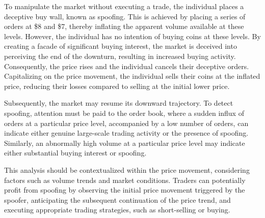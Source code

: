 To manipulate the market without executing a trade, the individual places a deceptive buy wall, known as spoofing. This
is achieved by placing a series of orders at \$8 and \$7, thereby inflating the apparent volume available at these levels.
However, the individual has no intention of buying coins at these levels. By creating a facade of significant buying
interest, the market is deceived into perceiving the end of the downturn, resulting in increased buying activity.
Consequently, the price rises and the individual cancels their deceptive orders. Capitalizing on the price movement, the
individual sells their coins at the inflated price, reducing their losses compared to selling at the initial lower price.

Subsequently, the market may resume its downward trajectory. To detect spoofing, attention must be paid to the order book,
where a sudden influx of orders at a particular price level, accompanied by a low number of orders, can indicate either
genuine large-scale trading activity or the presence of spoofing. Similarly, an abnormally high volume at a particular
price level may indicate either substantial buying interest or spoofing.

This analysis should be contextualized within the price movement, considering factors such as volume trends and market
conditions. Traders can potentially profit from spoofing by observing the initial price movement triggered by the spoofer,
anticipating the subsequent continuation of the price trend, and executing appropriate trading strategies, such as
short-selling or buying.
